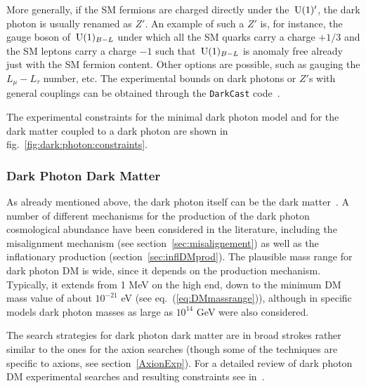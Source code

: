 More generally, if the SM fermions are charged directly under the $\,{\rm U}(1)'$, 
the dark photon is usually renamed as $Z'$. 
An example of such a $Z'$ is, for instance, the gauge boson of $\,{\rm U}(1)_{B-L}$ under which all the SM quarks carry a charge $+1/3$ and the SM leptons carry a charge $-1$ such that $\,{\rm U}(1)_{B-L}$  is anomaly free already just with the SM fermion content. Other options are possible, such as gauging the $L_\mu-L_\tau$ number, etc. The experimental bounds on dark photons or $Z'$s with general couplings can be obtained through the {\tt DarkCast} code~\cite{DarkCast}. 

The experimental constraints for the minimal dark photon model and for the dark matter coupled to a dark photon are shown in fig.~\ref{fig:dark:photon:constraints}.

\subsubsection{Dark Photon Dark Matter} 
As already mentioned above, the dark photon itself can be the dark matter~\cite{DPDM}.  
A number of different mechanisms for the production of the dark photon cosmological abundance have been considered in the literature, 
including the misalignment mechanism (see section~\ref{sec:misalignement})
as well as the inflationary production (section~\ref{sec:inflDMprod}). 
The plausible mass range for dark photon DM is wide, since it depends on the production mechanism. 
Typically, it extends from 1 MeV on the high end, down to the minimum DM mass value of about $10^{-21}$ eV 
(see eq.~(\ref{eq:DMmassrange})), although in specific models dark photon masses as large as $10^{14}$ GeV were also considered. 

The search strategies for dark photon dark matter are in broad strokes rather similar to the ones for the axion searches 
(though some of the techniques are specific to axions, see section~\ref{AxionExp}). 
For a detailed review of dark photon DM experimental searches and resulting constraints see  in~\cite{DPDM}.




